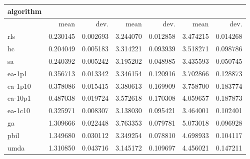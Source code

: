 \begin{tabular}{@{}l*{6}{>{{}}N{1}{2}}@{}}
\toprule
{algorithm} &  &  &  \\
\midrule
& {mean} & {dev.} & {mean} & {dev.} & {mean} & {dev.} \\
\midrule
rls & 0.230145 & 0.002693 & 3.244070 & 0.012858 & 3.474215 & 0.014268 \\
 hc & 0.204049 & 0.005183 & 3.314221 & 0.093939 & 3.518271 & 0.098786 \\
 sa & 0.240392 & 0.005242 & 3.195202 & 0.048985 & 3.435593 & 0.050745 \\
 ea-1p1 & 0.356713 & 0.013342 & 3.346154 & 0.120916 & 3.702866 & 0.128873 \\
 ea-1p10 & 0.378086 & 0.015415 & 3.380613 & 0.169909 & 3.758700 & 0.183774 \\
 ea-10p1 & 0.487038 & 0.019724 & 3.572618 & 0.170308 & 4.059657 & 0.187873 \\
 ea-1c10 & 0.325971 & 0.008307 & 3.138030 & 0.095421 & 3.464001 & 0.102401 \\
 ga & 1.309666 & 0.022448 & 3.763353 & 0.079781 & 5.073018 & 0.096928 \\
 pbil & 1.349680 & 0.030112 & 3.349254 & 0.078810 & 4.698933 & 0.104117 \\
 umda & 1.310850 & 0.043716 & 3.145172 & 0.109697 & 4.456021 & 0.147211 \\
 \bottomrule
\end{tabular}
